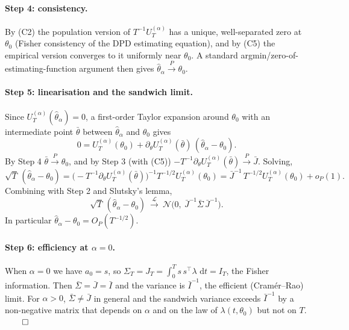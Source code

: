 \documentclass[11pt]{article}
\newcommand{\dd}{\,\mathrm{d}}
\newcommand{\toP}{\xrightarrow{P}}
\newcommand{\toL}{\xrightarrow{\mathcal{L}}}
\begin{document}
\paragraph{Step 4: consistency.}
By (C2) the population version of $T^{-1}U_T^{(\alpha)}$ has a unique, well-separated
zero at $\theta_0$ (Fisher consistency of the DPD estimating equation), and by (C5)
the empirical version converges to it uniformly near $\theta_0$. A standard
argmin/zero-of-estimating-function argument then gives $\hat\theta_\alpha\toP\theta_0$.

\paragraph{Step 5: linearisation and the sandwich limit.}
Since $U_T^{(\alpha)}(\hat\theta_\alpha)=0$, a first-order Taylor expansion around
$\theta_0$ with an intermediate point $\bar\theta$ between $\hat\theta_\alpha$ and
$\theta_0$ gives
\[
0=U_T^{(\alpha)}(\theta_0)+\partial_\theta U_T^{(\alpha)}(\bar\theta)\,(\hat\theta_\alpha-\theta_0).
\]
By Step 4 $\bar\theta\toP\theta_0$, and by Step 3 (with (C5))
$-T^{-1}\partial_\theta U_T^{(\alpha)}(\bar\theta)\toP\bar J$. Solving,
\[
\sqrt T\,(\hat\theta_\alpha-\theta_0)
=\Big(-T^{-1}\partial_\theta U_T^{(\alpha)}(\bar\theta)\Big)^{-1}
T^{-1/2}U_T^{(\alpha)}(\theta_0)
=\bar J^{-1}\,T^{-1/2}U_T^{(\alpha)}(\theta_0)+o_P(1).
\]
Combining with Step 2 and Slutsky's lemma,
\[
\sqrt T\,(\hat\theta_\alpha-\theta_0)\ \toL\ \mathcal N\!\big(0,\ \bar J^{-1}\bar\Sigma\,\bar J^{-1}\big).
\]
In particular $\hat\theta_\alpha-\theta_0=O_P(T^{-1/2})$.

\paragraph{Step 6: efficiency at $\alpha=0$.}
When $\alpha=0$ we have $a_0=s$, so $\Sigma_T=J_T=\int_0^T s\,s^{\top}\lambda\,\dd t=I_T$,
the Fisher information. Then $\bar\Sigma=\bar J=\bar I$ and the variance is
$\bar I^{-1}$, the efficient (Cram\'er--Rao) limit. For $\alpha>0$, $\bar\Sigma\neq\bar J$
in general and the sandwich variance exceeds $\bar I^{-1}$ by a non-negative matrix
that depends on $\alpha$ and on the law of $\lambda(t,\theta_0)$ but not on $T$. $\qed$
\end{document}
